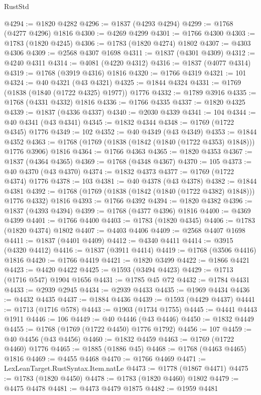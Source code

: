 \begin{lexlean}{RustStd}
\begin{coremodule}
@4294 := @1820 @4282
@4296 := @1837 (@4293 @4294)
@4299 := @1768 (@4277 @4296) @1816
@4300 := @4269 @4299
@4301 := @1766 @4300
@4303 := @1783 (@1820 @4245)
@4306 := @1783 (@1820 @4274) @1802
@4307 := @4303 @4306
@4309 := @2568 @4307 @1698
@4311 := @1837 (@4301 @4309)
@4312 := @4240 @4311
@4314 := @4081 (@4220 @4312)
@4316 := @1837 (@4077 @4314)
@4319 := @1768 (@3919 @4316) @1816
@4320 := @1766 @4319
@4321 := 101
@4324 := @40 @4321 (@43 @4321)
@4325 := @1844 @4324
@4331 := @1769 (@1838 (@1840 (@1722 @4325) @1977)) @1776
@4332 := @1789 @3916
@4335 := @1768 (@4331 @4332) @1816
@4336 := @1766 @4335
@4337 := @1820 @4325
@4339 := @1837 (@4336 @4337)
@4340 := @2030 @4339
@4341 := 104
@4344 := @40 @4341 (@43 @4341)
@4345 := @1832 @4344
@4348 := @1769 (@1722 @4345) @1776
@4349 := 102
@4352 := @40 @4349 (@43 @4349)
@4353 := @1844 @4352
@4363 := @1768 (@1769 (@1838 (@1842 (@1840 (@1722 @4353) @1848))) @1776 @3906) @1816
@4364 := @1766 @4363
@4365 := @1820 @4353
@4367 := @1837 (@4364 @4365)
@4369 := @1768 (@4348 @4367)
@4370 := 105
@4373 := @40 @4370 (@43 @4370)
@4374 := @1832 @4373
@4377 := @1769 (@1722 @4374) @1776
@4378 := 103
@4381 := @40 @4378 (@43 @4378)
@4382 := @1844 @4381
@4392 := @1768 (@1769 (@1838 (@1842 (@1840 (@1722 @4382) @1848))) @1776 @4332) @1816
@4393 := @1766 @4392
@4394 := @1820 @4382
@4396 := @1837 (@4393 @4394)
@4399 := @1768 (@4377 @4396) @1816
@4400 := @4369 @4399
@4401 := @1766 @4400
@4403 := @1783 (@1820 @4345)
@4406 := @1783 (@1820 @4374) @1802
@4407 := @4403 @4406
@4409 := @2568 @4407 @1698
@4411 := @1837 (@4401 @4409)
@4412 := @4340 @4411
@4414 := @3915 (@4320 @4412)
@4416 := @1837 (@3911 @4414)
@4419 := @1768 (@3506 @4416) @1816
@4420 := @1766 @4419
@4421 := @1820 @3499
@4422 := @1866 @4421
@4423 := @4420 @4422
@4425 := @1593 (@3494 @4423)
@4429 := @1713 (@1716 @547) @1904 @1656
@4431 := @1785 @45 @72
@4432 := @1784 @4431
@4433 := @2939 @2945
@4434 := @2939 @4433
@4435 := @1969 @4434
@4436 := @4432 @4435
@4437 := @1884 @4436
@4439 := @1593 (@4429 @4437)
@4441 := @1713 (@1716 @578)
@4443 := @1903 (@1734 @1755)
@4445 := @4441 @4443 @1911
@4446 := 106
@4449 := @40 @4446 (@43 @4446)
@4450 := @1832 @4449
@4455 := @1768 (@1769 (@1722 @4450) @1776 @1792)
@4456 := 107
@4459 := @40 @4456 (@43 @4456)
@4460 := @1832 @4459
@4463 := @1769 (@1722 @4460) @1776
@4465 := @1885 (@1886 @45)
@4468 := @1768 (@4463 @4465) @1816
@4469 := @4455 @4468
@4470 := @1766 @4469
@4471 := LexLeanTarget.RustSyntax.Item.natLe
@4473 := @1778 (@1867 @4471)
@4475 := @1783 (@1820 @4450)
@4478 := @1783 (@1820 @4460) @1802
@4479 := @4475 @4478
@4481 := @4473 @4479 @1875
@4482 := @1959 @4481

\end{coremodule}
\end{lexlean}
